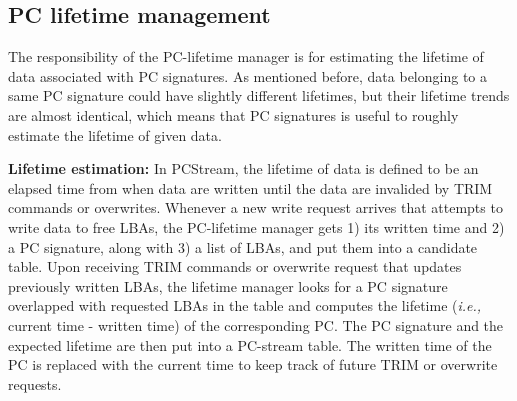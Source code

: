 

\subsection{PC lifetime management}
The responsibility of the PC-lifetime manager is for estimating the lifetime of
data associated with PC signatures. As mentioned before, data belonging to a
same PC signature could have slightly different lifetimes, but their lifetime
trends are almost identical, which means that PC signatures is useful to
roughly estimate the lifetime of given data.

\textbf{Lifetime estimation:}
In \textsf{PCStream}, the lifetime of data is defined to be an elapsed time
from when data are written until the data are invalided by TRIM commands or
overwrites. Whenever a new write request arrives that attempts to write data to
free LBAs, the PC-lifetime manager gets 1) its written time and 2) a PC
signature, along with 3) a list of LBAs, and put them into a candidate table.
Upon receiving TRIM commands or overwrite request that updates previously
written LBAs, the lifetime manager looks for a PC signature overlapped with
requested LBAs in the table and computes the lifetime (\textit{i.e.,} current
time - written time) of the corresponding PC.  The PC signature and the
expected lifetime are then put into a PC-stream table.  The written time of the
PC is replaced with the current time to keep track of future TRIM or overwrite
requests.  

